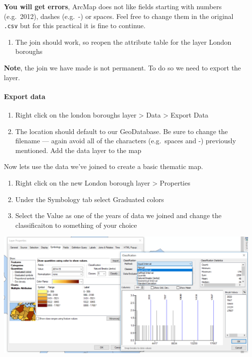\documentclass[]{book}
\providecommand{\tightlist}{%
  \setlength{\itemsep}{0pt}\setlength{\parskip}{0pt}}
\let\oldparagraph\paragraph
\renewcommand{\paragraph}[1]{\oldparagraph{#1}\mbox{}}
\begin{document}
\textbf{You will get errors}, ArcMap does not like fields starting with numbers (e.g.~2012), dashes (e.g.~-) or spaces. Feel free to change them in the original \texttt{.csv} but for this practical it is fine to continue.

\begin{enumerate}
\def\labelenumi{\arabic{enumi}.}
\setcounter{enumi}{13}
\tightlist
\item
  The join should work, so reopen the attribute table for the layer London boroughs
\end{enumerate}

\textbf{Note}, the join we have made is not permanent. To do so we need to export the layer.

\hypertarget{export-data}{%
\paragraph{Export data}\label{export-data}}

\begin{enumerate}
\def\labelenumi{\arabic{enumi}.}
\setcounter{enumi}{14}
\tightlist
\item
  Right click on the london boroughs layer \textgreater{} Data \textgreater{} Export Data
\item
  The location should default to our GeoDatabase. Be sure to change the filename --- again avoid all of the characters (e.g.~spaces and -) previously mentioned. Add the data layer to the map
\end{enumerate}

Now lets use the data we've joined to create a basic thematic map.

\begin{enumerate}
\def\labelenumi{\arabic{enumi}.}
\setcounter{enumi}{16}
\tightlist
\item
  Right click on the new London borough layer \textgreater{} Properties
\item
  Under the Symbology tab select Graduated colors
\item
  Select the Value as one of the years of data we joined and change the classificaiton to something of your choice
\end{enumerate}

\begin{center}\includegraphics[width=800pt]{prac1_images/symbology} \end{center}
\end{document}
